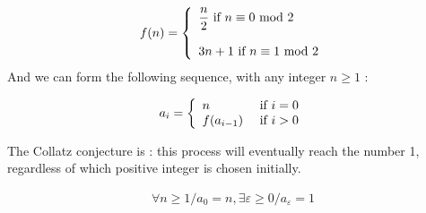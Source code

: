 \[
    f(n)=\left\{
    \begin{array}{ll}
        \dfrac{n}{2} $ if $ n \equiv 0 $ mod $ 2\\
        \\
        3n+1 $ if $ n \equiv 1 $ mod $ 2
    \end{array}
    \right.
\]
And we can form the following sequence, with any integer $n \geq 1$ :

\begin{large}
    \[
        a_i=\left\{
            \begin{array}{ll}
                n & $ if $ i = 0\\
                f(a_ {i-1}) & $ if $ i > 0
            \end{array}
            \right.
            \]
\end{large}
The Collatz conjecture is : this process will eventually reach the number 1, regardless of which positive integer is chosen initially.

\begin{large}    
\begin{align}
    \forall n \geq 1 / a_0 = n, \exists \varepsilon \geq 0 / a_{\varepsilon} = 1
\end{align} 
\end{large}